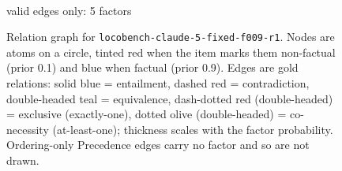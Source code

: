 \documentclass[11pt]{article}
\begin{document}
\begin{figure}[htbp]
\begin{minipage}[t]{0.48\linewidth}
{
}
\\[2pt]{\footnotesize valid edges only: 5 factors}
\end{minipage}
\caption{Relation graph for \texttt{locobench-claude-5-fixed-f009-r1}. Nodes are atoms on a circle, tinted red when the item marks them non-factual (prior 0.1) and blue when factual (prior 0.9). Edges are gold relations: solid blue = entailment, dashed red = contradiction, double-headed teal = equivalence, dash-dotted red (double-headed) = exclusive (exactly-one), dotted olive (double-headed) = co-necessity (at-least-one); thickness scales with the factor probability. Ordering-only Precedence edges carry no factor and so are not drawn.}
\label{fig:graph-locobench-claude-5-fixed-f009-r1}
\end{figure}
\end{document}
